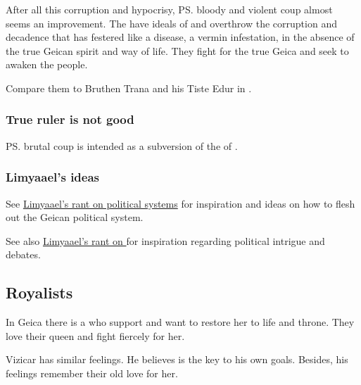 \begin{garbage}
After all this corruption and hypocrisy, \ps{\Belzir}{} bloody and violent coup almost seems an improvement. The  have ideals of  and overthrow the corruption and decadence that has festered like a disease, a vermin infestation, in the absence of the true Geican spirit and way of life. They fight for the true Geica and seek to awaken the people. 

Compare them to Bruthen Trana and his Tiste Edur in \MalazanReapersGale. 





\subsubsection{True ruler is not good}
\ps{\Belzir} brutal coup is intended as a subversion of the \cliche{} of . 





\subsubsection{Limyaael's ideas}
See \href{http://limyaael.insanejournal.com/205202.html}{Limyaael's rant on political systems} for inspiration and ideas on how to flesh out the Geican political system. 

See also \href{http://limyaael.insanejournal.com/205202.html}{Limyaael's rant on } for inspiration regarding political intrigue and debates. 







\subsection{Royalists}
In Geica there is a  who support \Belzir{} and want to restore her to life and throne. 
They love their queen and fight fiercely for her. 

Vizicar has similar feelings. 
He believes \Belzir{} is the key to his own goals. 
Besides, his feelings remember their old love for her. 

\end{garbage}
